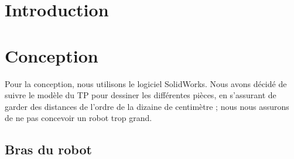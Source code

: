 \documentclass[a4paper, 11pt]{report}
\begin{document}

\clearpage\setcounter{page}{2}

\tableofcontents

\section*{Introduction}

\section{Conception}

Pour la conception, nous utilisons le logiciel SolidWorks. Nous avons décidé de suivre le modèle du TP pour dessiner les différentes pièces, 
en s'assurant de garder des distances de l'ordre de la dizaine de centimètre ; nous nous assurons de ne pas concevoir un robot trop grand.

\subsection{Bras du robot}
\end{document}
